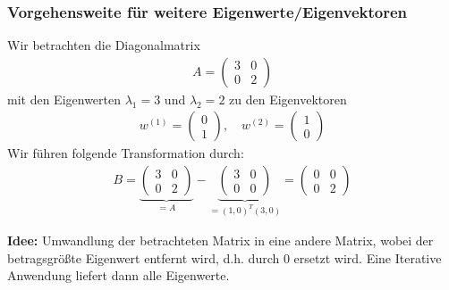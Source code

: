 \subsubsection{Vorgehensweite für weitere Eigenwerte/Eigenvektoren}
Wir betrachten die Diagonalmatrix
%
\begin{align*}
  A = \begin{pmatrix}
    3 & 0 \\ 0 & 2
  \end{pmatrix}
\end{align*}
%
mit den Eigenwerten $\lambda_1=3$ und $\lambda_2=2$ zu den Eigenvektoren
%
\begin{align*}
  w^{(1)}=\begin{pmatrix}
    0 \\ 1
  \end{pmatrix}, \quad w^{(2)}= \begin{pmatrix}
    1 \\ 0
  \end{pmatrix}
\end{align*}
%
Wir führen folgende Transformation durch:
%
\begin{align*}
  B = \underbrace{\begin{pmatrix}
    3 & 0 \\ 0 & 2
  \end{pmatrix}}_{=A} - \underbrace{\begin{pmatrix}
    3 & 0 \\ 0 & 0
  \end{pmatrix}}_{=(1,0)^T(3,0)} 
  = \begin{pmatrix}
    0 & 0 \\ 0 & 2
  \end{pmatrix}
\end{align*}

\textbf{Idee:} Umwandlung der betrachteten Matrix in eine andere Matrix, wobei der betragsgrößte Eigenwert entfernt
wird, d.h. durch $0$ ersetzt wird. Eine Iterative Anwendung liefert dann alle Eigenwerte. 

